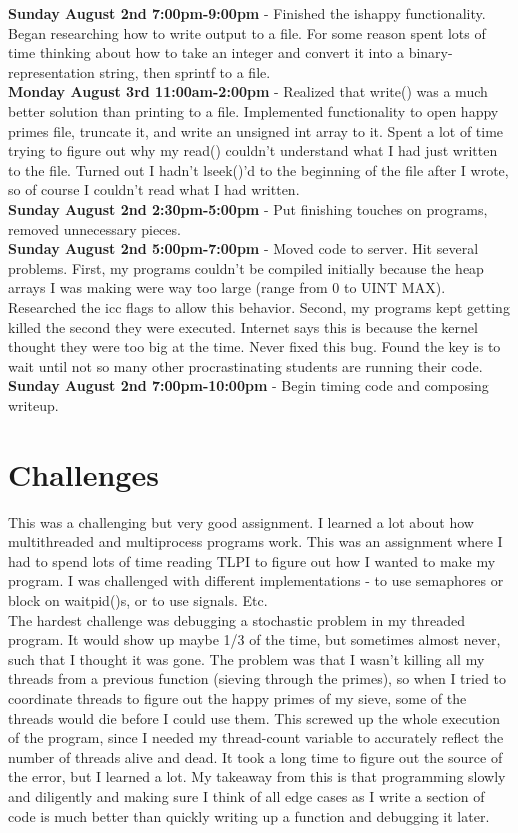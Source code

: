 \documentclass[11pt]{article}
\begin{document}
\textbf{Sunday August 2nd 7:00pm-9:00pm} - Finished the ishappy functionality. Began researching how to write output to a file. For some reason spent lots of time thinking about how to take an integer and convert it into a binary-representation string, then sprintf to a file. \\
\textbf{Monday August 3rd 11:00am-2:00pm} - Realized that write() was a much better solution than printing to a file. Implemented functionality to open happy primes file, truncate it, and write an unsigned int array to it. Spent a lot of time trying to figure out why my read() couldn't understand what I had just written to the file. Turned out I hadn't lseek()'d to the beginning of the file after I wrote, so of course I couldn't read what I had written. \\
\textbf{Sunday August 2nd 2:30pm-5:00pm} - Put finishing touches on programs, removed unnecessary pieces. \\
\textbf{Sunday August 2nd 5:00pm-7:00pm} - Moved code to server. Hit several problems. First, my programs couldn't be compiled initially because the heap arrays I was making were way too large (range from 0 to UINT MAX). Researched the icc flags to allow this behavior. Second, my programs kept getting killed the second they were executed. Internet says this is because the kernel thought they were too big at the time. Never fixed this bug. Found the key is to wait until not so many other procrastinating students are running their code. \\
\textbf{Sunday August 2nd 7:00pm-10:00pm} - Begin timing code and composing writeup. \\



\section{Challenges}
This was a challenging but very good assignment. I learned a lot about how multithreaded and multiprocess programs work. This was an assignment where I had to spend lots of time reading TLPI to figure out how I wanted to make my program. I was challenged with different implementations - to use semaphores or block on waitpid()s, or to use signals. Etc. \\

The hardest challenge was debugging a stochastic problem in my threaded program. It would show up maybe 1/3 of the time, but sometimes almost never, such that I thought it was gone. The problem was that I wasn't killing all my threads from a previous function (sieving through the primes), so when I tried to coordinate threads to figure out the happy primes of my sieve, some of the threads would die before I could use them. This screwed up the whole execution of the program, since I needed my thread-count variable to accurately reflect the number of threads alive and dead. It took a long time to figure out the source of the error, but I learned a lot. My takeaway from this is that programming slowly and diligently and making sure I think of all edge cases as I write a section of code is much better than quickly writing up a function and debugging it later. \\
\end{document}

